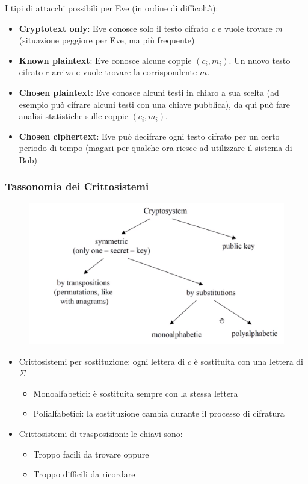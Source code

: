 	I tipi di attacchi possibili per Eve (in ordine di difficoltà):
\begin{itemize}
	\item \textbf{Cryptotext only}: Eve conosce solo il testo cifrato \textit{c} e vuole trovare \textit{m} (situazione peggiore per Eve, ma più frequente)
	\item \textbf{Known plaintext}: Eve conosce alcune coppie $(c_i, m_i)$. Un nuovo testo cifrato $c$ arriva e vuole trovare la corrispondente $m$.
	\item \textbf{Chosen plaintext}: Eve conosce alcuni testi in chiaro a sua scelta (ad esempio può cifrare alcuni testi con una chiave pubblica), da qui può fare analisi statistiche sulle coppie $(c_i, m_i)$.
	\item \textbf{Chosen ciphertext}: Eve può decifrare ogni testo cifrato per un certo periodo di tempo (magari per qualche ora riesce ad utilizzare il sistema di Bob)
\end{itemize}

\newpage

\subsubsection*{Tassonomia dei Crittosistemi}
\begin{figure}[h]
	\centering
	\includegraphics[width=\linewidth]{immagini/img31}
\end{figure}

\begin{itemize}
		\item Crittosistemi per sostituzione: ogni lettera di $c$ è sostituita con una lettera di $\Sigma$
		\begin{itemize}
			\item Monoalfabetici: è sostituita sempre con la stessa lettera
			\item Polialfabetici: la sostituzione cambia durante il processo di cifratura
		\end{itemize}
		\item Crittosistemi di trasposizioni: le chiavi sono:
		\begin{itemize}
			\item Troppo facili da trovare oppure
			\item Troppo difficili da ricordare
		\end{itemize}
	\end{itemize}

